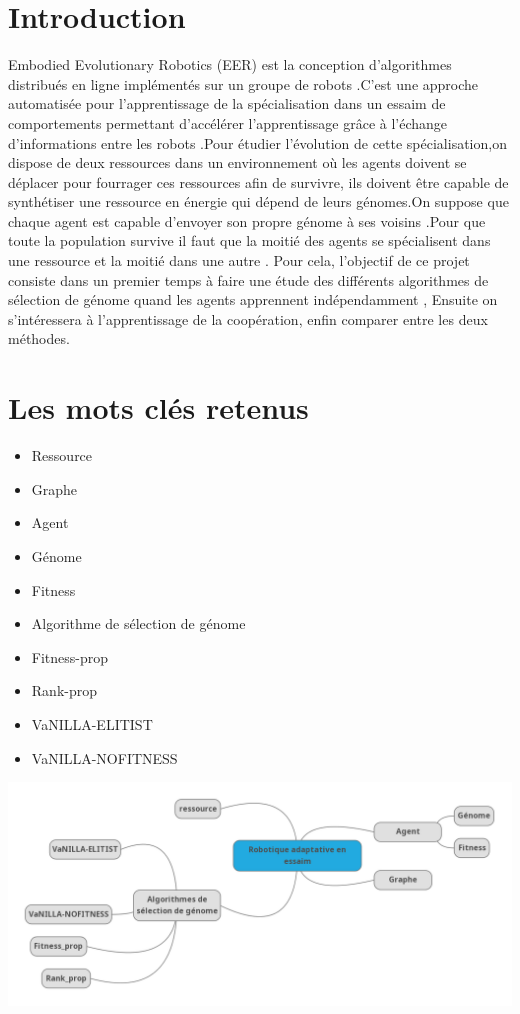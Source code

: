 \documentclass[11pt]{article}
\begin{document}
\begin{flushleft}
\section{Introduction}
 Embodied Evolutionary Robotics (EER) est la conception d’algorithmes distribués en ligne implémentés  sur un groupe de robots .C’est une approche automatisée pour l’apprentissage de la spécialisation dans un essaim de comportements permettant d'accélérer l’apprentissage grâce à l’échange d’informations entre les robots  .Pour étudier l'évolution  de cette spécialisation,on dispose de deux ressources dans un environnement où les agents doivent se déplacer pour fourrager ces ressources afin de survivre, ils doivent être capable de synthétiser une  ressource en énergie qui dépend de  leurs génomes.On suppose que chaque agent est capable d’envoyer son propre génome à ses voisins .Pour que  toute la population survive il faut  que la moitié des agents se spécialisent dans une ressource et la moitié dans une autre .
   Pour cela, l’objectif de ce projet consiste dans un premier temps à faire une étude des différents algorithmes de sélection de génome quand les agents apprennent indépendamment , Ensuite on s'intéressera  à l'apprentissage de la coopération, enfin comparer entre les deux méthodes.

\section{Les mots clés retenus}

 \begin{itemize} \item Ressource   \item Graphe  \item Agent\item Génome \item Fitness   \item Algorithme de sélection de génome  \item Fitness-prop \item Rank-prop  \item VaNILLA-ELITIST  \item VaNILLA-NOFITNESS 
  \end{itemize} 
\includegraphics[scale=0.4]{carte.png} 


\end{flushleft}
\end{document}
